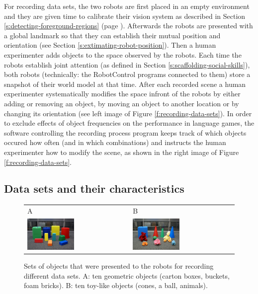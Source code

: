 For recording data sets, the two robots are first placed in an empty
environment and they are given time to calibrate their vision system
as described in Section \ref{s:detecting-foreground-regions} (page
\pageref{s:detecting-foreground-regions}). Afterwards the robots are
presented with a global landmark so that they can establish their
mutual position and orientation (see Section
\ref{s:extimating-robot-position}). Then a human experimenter adds
objects to the space observed by the robots. Each time the robots
establish joint attention (as defined in Section
\ref{s:scaffolding-social-skills}), both robots (technically: the
RobotControl programs connected to them) store a snapshot of their
world model at that time. After each recorded scene a human
experimenter systematically modifies the space infront of the robots
by either adding or removing an object, by moving an object to another
location or by changing its orientation (see left image of Figure
\ref{f:recording-data-sets}). In order to exclude effects of object
frequencies on the performance in language games, the software
controlling the recording process program keeps track of which objects
occured how often (and in which combinations) and instructs the human
experimenter how to modify the scene, as shown in the right image of
Figure \ref{f:recording-data-sets}.



\subsection{Data sets and their characteristics}
\label{s:recording-data-sets}

\begin{figure}[t]
  \begin{tabular}{ll}A & B\\
    \includegraphics[width=0.475\textwidth]{figures/data-sets-geometric-objects}&
    \includegraphics[width=0.475\textwidth]{figures/data-sets-toy-objects}\\
  \end{tabular}
  \caption{Sets of objects that were presented to the robots for
    recording different data sets. A: ten geometric objects (carton
    boxes, buckets, foam bricks). B: ten toy-like objects (cones,
    a ball, animals).}
  \label{f:object-sets}
\end{figure}

